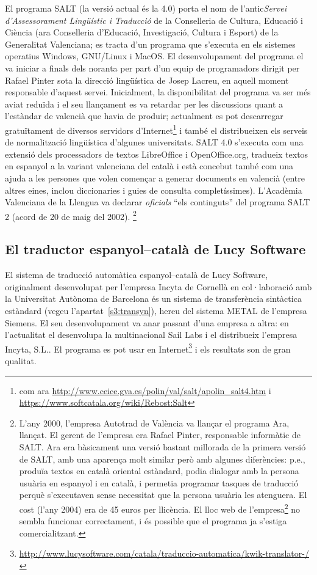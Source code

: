 El programa SALT (la versió actual és la 4.0) porta el nom de
l'antic\emph{Servei d'Assessorament Lingüístic i Traducció} de la
Conselleria de Cultura, Educació i Ciència (ara Conselleria
d'Educació, Investigació, Cultura i Esport) de la Generalitat
Valenciana; es tracta d'un programa que s'executa en els sistemes
operatius Windows, GNU/Linux i MacOS. El desenvolupament del programa
el va iniciar a finals dels noranta per part d'un equip de
programadors dirigit per Rafael Pinter sota la direcció lingüística de
Josep Lacreu, en aquell moment responsable d'aquest servei.
Inicialment, la disponibilitat del programa va ser més aviat reduïda i
el seu llançament es va retardar per les discussions quant a
l'estàndar de valencià que havia de produir; actualment es pot
descarregar gratuïtament de diversos servidors d'Internet\footnote{com
  ara \url{http://www.ceice.gva.es/polin/val/salt/apolin_salt4.htm} i
  \url{https://www.softcatala.org/wiki/Rebost:Salt}} i també el
distribueixen els serveis de normalització lingüística d'algunes
universitats.  SALT 4.0 s'executa com una extensió dels processadors
de textos LibreOffice i OpenOffice.org, tradueix textos en espanyol a
la variant valenciana del català i està concebut també com una ajuda a
les persones que volen començar a generar documents en valencià (entre
altres eines, inclou diccionaries i guies de consulta completíssimes).
L'Acadèmia Valenciana de la Llengua va declarar \emph{oficials} ``els
continguts'' del programa SALT 2 (acord de 20 de maig del
2002). \footnote{L'any 2000, l'empresa Autotrad de València va llançar
  el programa Ara, llançat. El gerent de l'empresa era Rafael Pinter,
  responsable informàtic de SALT. Ara era bàsicament una versió
  bastant millorada de la primera versió de SALT, amb una aparença
  molt similar però amb algunes diferències: p.e., produïa textos en
  català oriental estàndard, podia dialogar amb la persona usuària en
  espanyol i en català, i permetia programar tasques de traducció
  perquè s'executaven sense necessitat que la persona usuària les
  atenguera. El cost (l'any 2004) era de 45 euros per llicència. El
  lloc web de l'empresa\footnote{\url{http://www.ara-autotrad.es}} no
  sembla funcionar correctament, i és possible que el programa ja
  s'estiga comercialitzant.}

\subsection{El traductor espanyol--català de Lucy Software}

El sistema de traducció automàtica espanyol--català de Lucy Software,
originalment desenvolupat per l'empresa Incyta de Cornellà en
col·laboració amb la Universitat Autònoma de Barcelona és un sistema
de transferència sintàctica estàndard (vegeu
l'apartat~\ref{s3:transyn}), hereu del sistema METAL de l'empresa
Siemens. El seu desenvolupament va anar passant d'una empresa a altra:
en l'actualitat el desenvolupa la multinacional Sail Labs i el
distribueix l'empresa Incyta, S.L.. El programa es pot usar en
Internet\footnote{\url{http://www.lucysoftware.com/catala/traduccio-automatica/kwik-translator-/}}
i els resultats son de gran qualitat.

